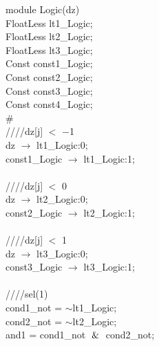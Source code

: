 module Logic(dz){ \\
\hspace*{2em}FloatLess lt1\_Logic; \\
\hspace*{2em}FloatLess lt2\_Logic; \\
\hspace*{2em}FloatLess lt3\_Logic; \\
\hspace*{2em}Const const1\_Logic; \\
\hspace*{2em}Const const2\_Logic; \\
\hspace*{2em}Const const3\_Logic; \\
\hspace*{2em}Const const4\_Logic; \\
\# \\
\hspace*{2em}////dz[j] $<$ $-$1 \\
\hspace*{2em}dz $\rightarrow$ lt1\_Logic:0; \\
\hspace*{2em}const1\_Logic $\rightarrow$ lt1\_Logic:1; \\
   \\
   \hspace*{2em}////dz[j] $<$ 0 \\
   \hspace*{2em}dz $\rightarrow$ lt2\_Logic:0; \\
   \hspace*{2em}const2\_Logic $\rightarrow$ lt2\_Logic:1; \\
   \\
   \hspace*{2em}////dz[j] $<$ 1 \\
   \hspace*{2em}dz $\rightarrow$ lt3\_Logic:0; \\
   \hspace*{2em}const3\_Logic $\rightarrow$ lt3\_Logic:1; \\
   \\
   \hspace*{2em}////sel(1) \\
   \hspace*{2em}cond1\_not = $\sim$lt1\_Logic; \\
   \hspace*{2em}cond2\_not = $\sim$lt2\_Logic; \\
   \hspace*{2em}and1 = cond1\_not $\And$ cond2\_not; \\
}
